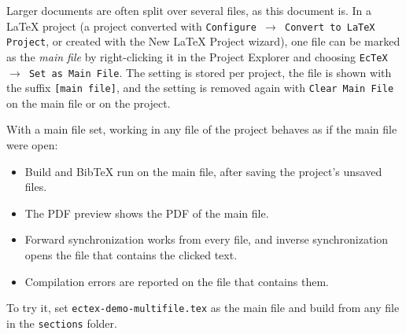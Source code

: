 Larger documents are often split over several files, as this document is.
In a LaTeX project (a project converted with
\texttt{Configure $\rightarrow$ Convert to LaTeX Project}, or created with
the New LaTeX Project wizard), one file can be marked as the \emph{main file}
by right-clicking it in the Project Explorer and choosing
\texttt{EcTeX $\rightarrow$ Set as Main File}. The setting is stored per
project, the file is shown with the suffix \texttt{[main file]}, and the
setting is removed again with \texttt{Clear Main File} on the main file or
on the project.

With a main file set, working in any file of the project behaves as if the
main file were open:

\begin{itemize}[noitemsep]
    \item Build and BibTeX run on the main file, after saving the
    project's unsaved files.
    \item The PDF preview shows the PDF of the main file.
    \item Forward synchronization works from every file, and inverse
    synchronization opens the file that contains the clicked text.
    \item Compilation errors are reported on the file that contains them.
\end{itemize}

To try it, set \texttt{ectex-demo-multifile.tex} as the main file and build
from any file in the \texttt{sections} folder.
